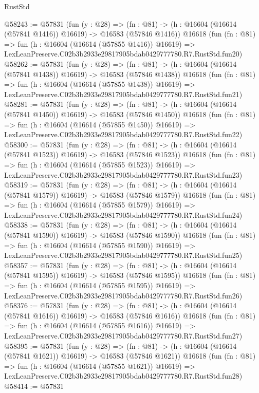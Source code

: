 \begin{lexlean}{RustStd}
\begin{coremodule}
@58243 := @57831
    (fun (y : @28) =>
    (fn : @81) -> (h : @16604 (@16614 (@57841 @1416)) @16619) -> @16583 (@57846 @1416))
    @16618
    (fun (fn : @81) =>
    fun (h : @16604 (@16614 (@57855 @1416)) @16619) =>
    LexLeanPreserve.C02b3b2933e29817905bdab0429777780.R7.RustStd.fun20)
@58262 := @57831
    (fun (y : @28) =>
    (fn : @81) -> (h : @16604 (@16614 (@57841 @1438)) @16619) -> @16583 (@57846 @1438))
    @16618
    (fun (fn : @81) =>
    fun (h : @16604 (@16614 (@57855 @1438)) @16619) =>
    LexLeanPreserve.C02b3b2933e29817905bdab0429777780.R7.RustStd.fun21)
@58281 := @57831
    (fun (y : @28) =>
    (fn : @81) -> (h : @16604 (@16614 (@57841 @1450)) @16619) -> @16583 (@57846 @1450))
    @16618
    (fun (fn : @81) =>
    fun (h : @16604 (@16614 (@57855 @1450)) @16619) =>
    LexLeanPreserve.C02b3b2933e29817905bdab0429777780.R7.RustStd.fun22)
@58300 := @57831
    (fun (y : @28) =>
    (fn : @81) -> (h : @16604 (@16614 (@57841 @1523)) @16619) -> @16583 (@57846 @1523))
    @16618
    (fun (fn : @81) =>
    fun (h : @16604 (@16614 (@57855 @1523)) @16619) =>
    LexLeanPreserve.C02b3b2933e29817905bdab0429777780.R7.RustStd.fun23)
@58319 := @57831
    (fun (y : @28) =>
    (fn : @81) -> (h : @16604 (@16614 (@57841 @1579)) @16619) -> @16583 (@57846 @1579))
    @16618
    (fun (fn : @81) =>
    fun (h : @16604 (@16614 (@57855 @1579)) @16619) =>
    LexLeanPreserve.C02b3b2933e29817905bdab0429777780.R7.RustStd.fun24)
@58338 := @57831
    (fun (y : @28) =>
    (fn : @81) -> (h : @16604 (@16614 (@57841 @1590)) @16619) -> @16583 (@57846 @1590))
    @16618
    (fun (fn : @81) =>
    fun (h : @16604 (@16614 (@57855 @1590)) @16619) =>
    LexLeanPreserve.C02b3b2933e29817905bdab0429777780.R7.RustStd.fun25)
@58357 := @57831
    (fun (y : @28) =>
    (fn : @81) -> (h : @16604 (@16614 (@57841 @1595)) @16619) -> @16583 (@57846 @1595))
    @16618
    (fun (fn : @81) =>
    fun (h : @16604 (@16614 (@57855 @1595)) @16619) =>
    LexLeanPreserve.C02b3b2933e29817905bdab0429777780.R7.RustStd.fun26)
@58376 := @57831
    (fun (y : @28) =>
    (fn : @81) -> (h : @16604 (@16614 (@57841 @1616)) @16619) -> @16583 (@57846 @1616))
    @16618
    (fun (fn : @81) =>
    fun (h : @16604 (@16614 (@57855 @1616)) @16619) =>
    LexLeanPreserve.C02b3b2933e29817905bdab0429777780.R7.RustStd.fun27)
@58395 := @57831
    (fun (y : @28) =>
    (fn : @81) -> (h : @16604 (@16614 (@57841 @1621)) @16619) -> @16583 (@57846 @1621))
    @16618
    (fun (fn : @81) =>
    fun (h : @16604 (@16614 (@57855 @1621)) @16619) =>
    LexLeanPreserve.C02b3b2933e29817905bdab0429777780.R7.RustStd.fun28)
@58414 := @57831

\end{coremodule}
\end{lexlean}
